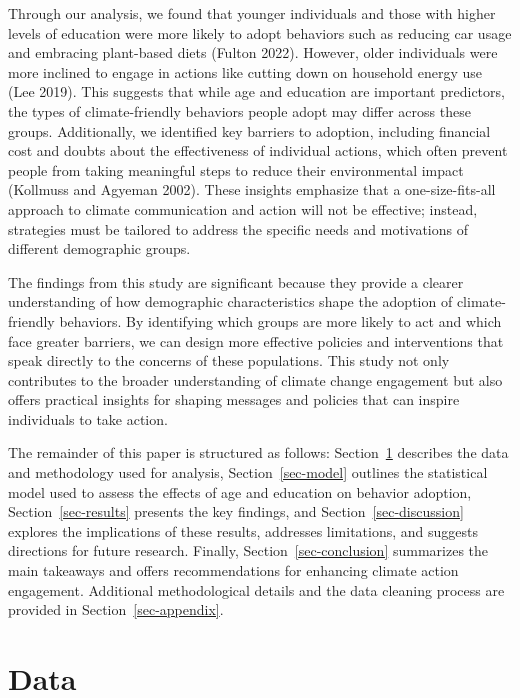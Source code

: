 \documentclass[
  letterpaper,
  DIV=11,
  numbers=noendperiod]{scrartcl}
\begin{document}
Through our analysis, we found that younger individuals and those with
higher levels of education were more likely to adopt behaviors such as
reducing car usage and embracing plant-based diets (Fulton 2022).
However, older individuals were more inclined to engage in actions like
cutting down on household energy use (Lee 2019). This suggests that
while age and education are important predictors, the types of
climate-friendly behaviors people adopt may differ across these groups.
Additionally, we identified key barriers to adoption, including
financial cost and doubts about the effectiveness of individual actions,
which often prevent people from taking meaningful steps to reduce their
environmental impact (Kollmuss and Agyeman 2002). These insights
emphasize that a one-size-fits-all approach to climate communication and
action will not be effective; instead, strategies must be tailored to
address the specific needs and motivations of different demographic
groups.

The findings from this study are significant because they provide a
clearer understanding of how demographic characteristics shape the
adoption of climate-friendly behaviors. By identifying which groups are
more likely to act and which face greater barriers, we can design more
effective policies and interventions that speak directly to the concerns
of these populations. This study not only contributes to the broader
understanding of climate change engagement but also offers practical
insights for shaping messages and policies that can inspire individuals
to take action.

The remainder of this paper is structured as follows:
Section~\ref{sec-data} describes the data and methodology used for
analysis, Section~\ref{sec-model} outlines the statistical model used to
assess the effects of age and education on behavior adoption,
Section~\ref{sec-results} presents the key findings, and
Section~\ref{sec-discussion} explores the implications of these results,
addresses limitations, and suggests directions for future research.
Finally, Section~\ref{sec-conclusion} summarizes the main takeaways and
offers recommendations for enhancing climate action engagement.
Additional methodological details and the data cleaning process are
provided in Section~\ref{sec-appendix}.

\section{Data}\label{sec-data}
\end{document}
